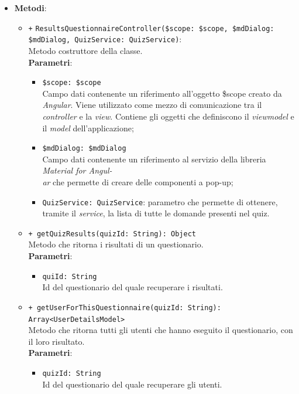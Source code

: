 \begin{itemize}
\begin{itemize}
	\end{itemize}
	\item \textbf{Metodi}:
	\begin{itemize}
		\item \texttt{+} \texttt{ResultsQuestionnaireController(\$scope: \$scope, \$mdDialog: \$mdDialog, QuizService: QuizService)}: \\Metodo costruttore della classe. \\
		\textbf{Parametri}:
			\begin{itemize}
					\item \texttt{\$scope: \$scope} \\
					Campo dati contenente un riferimento all'oggetto \$scope creato da \textit{Angular}. Viene utilizzato come mezzo di comunicazione tra il \textit{controller\ped{G}} e la \textit{view}. Contiene gli oggetti che definiscono il \textit{viewmodel\ped{G}} e il \textit{model} dell'applicazione;
					\item \texttt{\$mdDialog: \$mdDialog} \\
					Campo dati contenente un riferimento al servizio della libreria \textit{Material for Angul-\\ar{}} che permette di creare delle componenti a pop-up;
					\item \texttt{QuizService: QuizService}: parametro che permette di ottenere, tramite il \textit{service}, la lista di tutte le domande presenti nel quiz. 
			\end{itemize}
		\item \texttt{+ getQuizResults(quizId: String): Object} \\ Metodo che ritorna i risultati di un questionario. \\
		\textbf{Parametri}:
		\begin{itemize}
			\item \texttt{quiId: String} \\ Id del questionario del quale recuperare i risultati.
		\end{itemize}
		\item \texttt{+ getUserForThisQuestionnaire(quizId: String): Array<UserDetailsModel>} \\ Metodo che ritorna tutti gli utenti che hanno eseguito il questionario, con il loro risultato. \\
		\textbf{Parametri}:
		\begin{itemize}
			\item \texttt{quizId: String} \\ Id del questionario del quale recuperare gli utenti.
		\end{itemize}
	\end{itemize}
\end{itemize}

